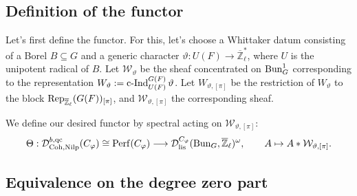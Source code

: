 %
%

\subsection{Definition of the functor}

Let's first define the functor. For this, let's choose a Whittaker datum consisting of a Borel $B \subseteq G$ and a generic character $\vartheta: U(F) \to \overline{\mathbb{Z}}_{\ell}^*$, where $U$ is the unipotent radical of $B$. Let $\mathcal{W}_{\vartheta}$ be the sheaf concentrated on $\operatorname{\operatorname{Bun}}_G^1$ corresponding to the representation $W_{\vartheta}:=\operatorname{\operatorname{c-Ind}}_{U(F)}^{G(F)}\vartheta$. Let $W_{\vartheta, [\pi]}$ be the restriction of $W_{\vartheta}$ to the block $\operatorname{\operatorname{Rep}}_{\overline{\mathbb{Z}}_{\ell}}(G(F))_{[\pi]}$, and $\mathcal{W}_{\vartheta, [\pi]}$ the corresponding sheaf.

We define our desired functor by spectral acting on $\mathcal{W}_{\vartheta, [\pi]}$:
$$\Theta: \mathcal{D}^{b, \operatorname{\operatorname{qc}}}_{\operatorname{\operatorname{Coh}}, \operatorname{\operatorname{Nilp}}}(C_{\varphi}) \cong \operatorname{\operatorname{Perf}}(C_{\varphi}) \longrightarrow \mathcal{D}_{\operatorname{\operatorname{lis}}}^{C_{\varphi}}(\operatorname{\operatorname{Bun}}_G, \overline{\mathbb{Z}}_{\ell})^{\omega}, \qquad A \mapsto A*\mathcal{W}_{\vartheta, [\pi]}.$$

\subsection{Equivalence on the degree zero part}

